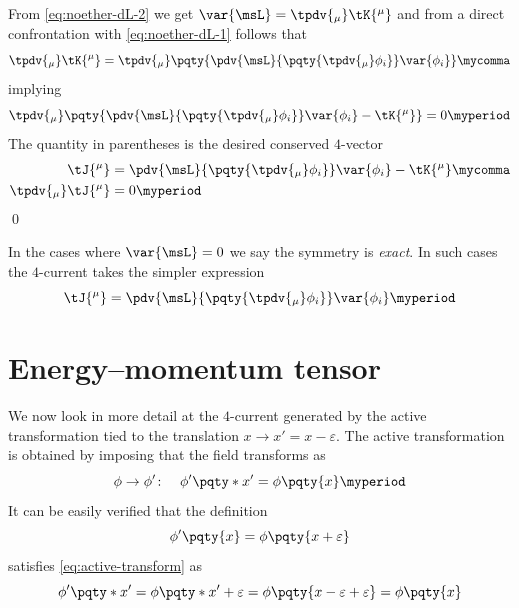         From \eqref{eq:noether-dL-2} we get $\var{\msL} = \tpdv{_\mu}\tK{^\mu}$ and from a direct confrontation with \eqref{eq:noether-dL-1} follows that
        \begin{equation*}
            \tpdv{_\mu} \tK{^\mu} = \tpdv{_\mu}\pqty{\pdv{\msL}{\pqty{\tpdv{_\mu}\phi_i}} \var{\phi_i}}
            \mycomma
        \end{equation*}
        implying
        \begin{equation*}
            \label{eq:noether-current-conserved}
            \tpdv{_\mu}\pqty{\pdv{\msL}{\pqty{\tpdv{_\mu}\phi_i}} \var{\phi_i} - \tK{^\mu}} = 0
            \myperiod
        \end{equation*}
        The quantity in parentheses is the desired conserved $4$-vector
        \begin{align}
            \label{eq:noether-current}
            \tJ{^\mu} &= \pdv{\msL}{\pqty{\tpdv{_\mu}\phi_i}} \var{\phi_i} - \tK{^\mu} 
            \mycomma \\
            \label{eq:noether-continuity}
            \tpdv{_\mu}\tJ{^\mu} &= 0
            \myperiod
        \end{align}
        \qed

        In the cases where $\var{\msL} = 0$ we say the symmetry is \emph{exact}.
        In such cases the $4$-current takes the simpler expression
        \begin{equation}
            \label{eq:noether-current-exact}
            \tJ{^\mu} = \pdv{\msL}{\pqty{\tpdv{_\mu}\phi_i}} \var{\phi_i}
            \myperiod
        \end{equation}
        
    \section{Energy--momentum tensor}
        We now look in more detail at the $4$-current generated by the active transformation tied to the translation $x \to x' = x - \varepsilon$.
        The active transformation is obtained by imposing that the field transforms as
        \begin{equation}
            \label{eq:active-transform}
            \phi \to \phi'\colon \quad \phi'\pqty*{x'} = \phi\pqty{x}
            \myperiod
        \end{equation}
        It can be easily verified that the definition
        \begin{equation}
            \label{eq:active-transform-definition}
            \phi'\pqty{x} = \phi\pqty{x + \varepsilon}
        \end{equation}
        satisfies \eqref{eq:active-transform} as 
        \begin{equation*}
            \phi'\pqty*{x'} = \phi\pqty*{x' + \varepsilon} = \phi\pqty{x - \varepsilon + \varepsilon} = \phi\pqty{x}
        \end{equation*}

